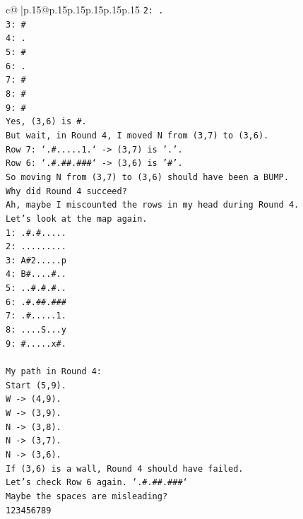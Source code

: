 \documentclass{article}
\begin{document}
{\begin{supertabular}{c@{$\;$}|p{.15\linewidth}@{}p{.15\linewidth}p{.15\linewidth}p{.15\linewidth}p{.15\linewidth}p{.15\linewidth}}
{{{\texttt{2: .} \\
\texttt{3: \#} \\
\texttt{4: .} \\
\texttt{5: \#} \\
\texttt{6: .} \\
\texttt{7: \#} \\
\texttt{8: \#} \\
\texttt{9: \#} \\
\texttt{Yes, (3,6) is \#.} \\
\texttt{But wait, in Round 4, I moved N from (3,7) to (3,6).} \\
\texttt{Row 7: `.\#.....1.` {-}> (3,7) is '.'.} \\
\texttt{Row 6: `.\#.\#\#.\#\#\#` {-}> (3,6) is '\#'.} \\
\texttt{So moving N from (3,7) to (3,6) should have been a BUMP.} \\
\texttt{Why did Round 4 succeed?} \\
\texttt{Ah, maybe I miscounted the rows in my head during Round 4.} \\
\texttt{Let's look at the map again.} \\
\texttt{1: .\#.\#.....} \\
\texttt{2: .........} \\
\texttt{3: A\#2.....p} \\
\texttt{4: B\#....\#..} \\
\texttt{5: ..\#.\#.\#..} \\
\texttt{6: .\#.\#\#.\#\#\#} \\
\texttt{7: .\#.....1.} \\
\texttt{8: ....S...y} \\
\texttt{9: \#.....x\#.} \\
\\ 
\texttt{My path in Round 4:} \\
\texttt{Start (5,9).} \\
\texttt{W {-}> (4,9).} \\
\texttt{W {-}> (3,9).} \\
\texttt{N {-}> (3,8).} \\
\texttt{N {-}> (3,7).} \\
\texttt{N {-}> (3,6).} \\
\texttt{If (3,6) is a wall, Round 4 should have failed.} \\
\texttt{Let's check Row 6 again. `.\#.\#\#.\#\#\#`} \\
\texttt{Maybe the spaces are misleading?} \\
\texttt{123456789} \\
}}}
\end{supertabular}}
\end{document}

